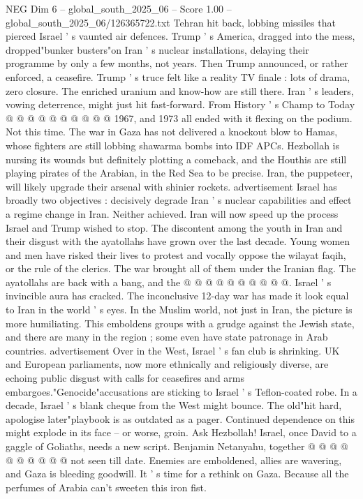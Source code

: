 \begin{textsample}{NEG Dim 6 – global\_south\_2025\_06 – Score 1.00 – global\_south\_2025\_06/126365722.txt}
Tehran hit back, lobbing missiles that pierced Israel ' s vaunted air defences.
Trump ' s America, dragged into the mess, dropped"bunker busters"on Iran ' s nuclear installations, delaying their programme by only a few months, not years.
Then Trump announced, or rather enforced, a ceasefire.
Trump ' s truce felt like a reality TV finale : lots of drama, zero closure.
The enriched uranium and know-how are still there.
Iran ' s leaders, vowing deterrence, might just hit fast-forward.
From History ' s Champ to Today @ @ @ @ @ @ @ @ @ @ 1967, and 1973 all ended with it flexing on the podium.
Not this time.
The war in Gaza has not delivered a knockout blow to Hamas, whose fighters are still lobbing shawarma bombs into IDF APCs.
Hezbollah is nursing its wounds but definitely plotting a comeback, and the Houthis are still playing pirates of the Arabian, in the Red Sea to be precise.
Iran, the puppeteer, will likely upgrade their arsenal with shinier rockets. advertisement Israel has broadly two objectives : decisively degrade Iran ' s nuclear capabilities and effect a regime change in Iran.
Neither achieved.
Iran will now speed up the process Israel and Trump wished to stop.
The discontent among the youth in Iran and their disgust with the ayatollahs have grown over the last decade.
Young women and men have risked their lives to protest and vocally oppose the wilayat faqih, or the rule of the clerics.
The war brought all of them under the Iranian flag.
The ayatollahs are back with a bang, and the @ @ @ @ @ @ @ @ @ @.
Israel ' s invincible aura has cracked.
The inconclusive 12-day war has made it look equal to Iran in the world ' s eyes.
In the Muslim world, not just in Iran, the picture is more humiliating.
This emboldens groups with a grudge against the Jewish state, and there are many in the region ; some even have state patronage in Arab countries. advertisement Over in the West, Israel ' s fan club is shrinking.
UK and European parliaments, now more ethnically and religiously diverse, are echoing public disgust with calls for ceasefires and arms embargoes."Genocide"accusations are sticking to Israel ' s Teflon-coated robe.
In a decade, Israel ' s blank cheque from the West might bounce.
The old"hit hard, apologise later"playbook is as outdated as a pager.
Continued dependence on this might explode in its face -- or worse, groin.
Ask Hezbollah!
Israel, once David to a gaggle of Goliaths, needs a new script.
Benjamin Netanyahu, together @ @ @ @ @ @ @ @ @ @ not seen till date.
Enemies are emboldened, allies are wavering, and Gaza is bleeding goodwill.
It ' s time for a rethink on Gaza.
Because all the perfumes of Arabia can't sweeten this iron fist.

\end{textsample}
